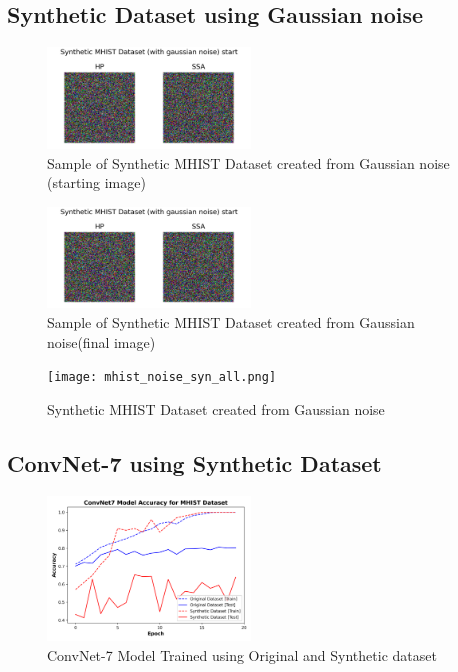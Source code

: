 \documentclass[conference, compsoc]{IEEEtran}
\begin{document}
\subsection{Synthetic Dataset using Gaussian noise}
\begin{figure}[H]
	\centering
	\includegraphics[width=0.48\textwidth]{mhist_noise_sample.png}
	\caption{Sample of Synthetic MHIST Dataset created from Gaussian noise (starting image)}
	\label{fig:mhist_noise_sample}
\end{figure}
\begin{figure}[H]
	\centering
	\includegraphics[width=0.48\textwidth]{mhist_noise_sample.png}
	\caption{Sample of Synthetic MHIST Dataset created from Gaussian noise(final image)}
	\label{fig:mhist_noise_final}
\end{figure}


\begin{figure}[H]
	\centering
	\texttt{[image: mhist\_noise\_syn\_all.png]}
	\caption{Synthetic MHIST Dataset created from Gaussian noise}
	\label{fig:mhist_noise_syn_all}
\end{figure}

\subsection{ConvNet-7 using Synthetic Dataset}
\begin{figure}[H]
	\centering
	\includegraphics[width=0.48\textwidth]{mhist_syn_acc.png}
	\caption{ConvNet-7 Model Trained using Original and Synthetic dataset}
	\label{fig:mhist_syn_acc}
\end{figure}
\end{document}
